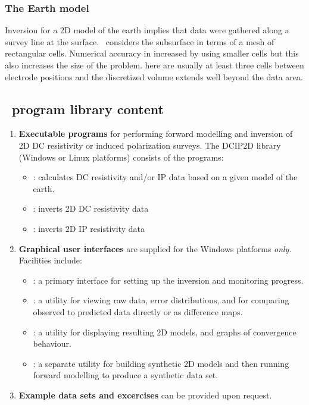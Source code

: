 \subsubsection{The Earth model}
Inversion for a 2D model of the earth implies that data were gathered along a survey line at the surface. \prog~considers the subsurface in terms of a mesh of rectangular cells. Numerical accuracy in increased by using smaller cells but this also increases the size of the problem. here are usually at least three cells between electrode positions and the discretized volume extends well beyond the data area. 


\subsection{\programName ~program library content}

\begin{enumerate}
\item \textbf{Executable programs} for performing forward modelling and inversion of 2D DC resistivity or induced polarization surveys. The DCIP2D library (Windows or Linux platforms) consists of the programs: 
  \begin{itemize}
  \item {}: calculates DC resistivity and/or IP data based on a given model of the earth.
  \item {}: inverts 2D DC resistivity data
  \item {}: inverts 2D IP resistivity data
  \end{itemize}
\item \textbf{Graphical user interfaces} are supplied for the Windows platforms \textit{only}. Facilities include: 
  \begin{itemize}
  \item {}: a primary interface for setting up the inversion and monitoring progress.
  \item {}: a utility for viewing raw data, error distributions, and for comparing observed to predicted data directly or as difference maps.
  \item {}: a utility for displaying resulting 2D models, and graphs of convergence behaviour.
  \item {}: a separate utility for building synthetic 2D models and then running forward modelling to produce a synthetic data set. 
  \end{itemize}
\item \textbf{Example data sets and excercises} can be provided upon request.
\end{enumerate}

